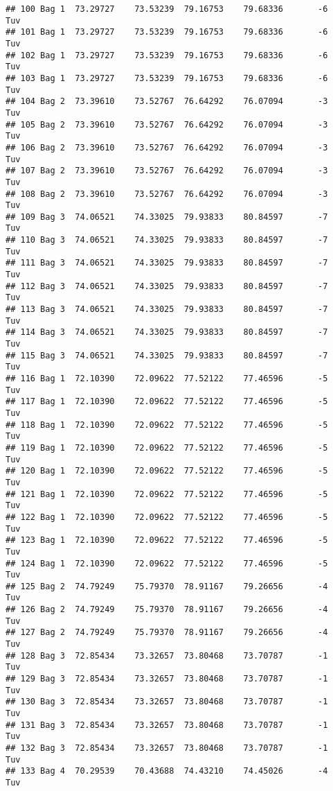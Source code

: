 \documentclass[
]{article}
\begin{document}
\begin{verbatim}
## 100 Bag 1  73.29727    73.53239  79.16753    79.68336       -6        Tuv
## 101 Bag 1  73.29727    73.53239  79.16753    79.68336       -6        Tuv
## 102 Bag 1  73.29727    73.53239  79.16753    79.68336       -6        Tuv
## 103 Bag 1  73.29727    73.53239  79.16753    79.68336       -6        Tuv
## 104 Bag 2  73.39610    73.52767  76.64292    76.07094       -3        Tuv
## 105 Bag 2  73.39610    73.52767  76.64292    76.07094       -3        Tuv
## 106 Bag 2  73.39610    73.52767  76.64292    76.07094       -3        Tuv
## 107 Bag 2  73.39610    73.52767  76.64292    76.07094       -3        Tuv
## 108 Bag 2  73.39610    73.52767  76.64292    76.07094       -3        Tuv
## 109 Bag 3  74.06521    74.33025  79.93833    80.84597       -7        Tuv
## 110 Bag 3  74.06521    74.33025  79.93833    80.84597       -7        Tuv
## 111 Bag 3  74.06521    74.33025  79.93833    80.84597       -7        Tuv
## 112 Bag 3  74.06521    74.33025  79.93833    80.84597       -7        Tuv
## 113 Bag 3  74.06521    74.33025  79.93833    80.84597       -7        Tuv
## 114 Bag 3  74.06521    74.33025  79.93833    80.84597       -7        Tuv
## 115 Bag 3  74.06521    74.33025  79.93833    80.84597       -7        Tuv
## 116 Bag 1  72.10390    72.09622  77.52122    77.46596       -5        Tuv
## 117 Bag 1  72.10390    72.09622  77.52122    77.46596       -5        Tuv
## 118 Bag 1  72.10390    72.09622  77.52122    77.46596       -5        Tuv
## 119 Bag 1  72.10390    72.09622  77.52122    77.46596       -5        Tuv
## 120 Bag 1  72.10390    72.09622  77.52122    77.46596       -5        Tuv
## 121 Bag 1  72.10390    72.09622  77.52122    77.46596       -5        Tuv
## 122 Bag 1  72.10390    72.09622  77.52122    77.46596       -5        Tuv
## 123 Bag 1  72.10390    72.09622  77.52122    77.46596       -5        Tuv
## 124 Bag 1  72.10390    72.09622  77.52122    77.46596       -5        Tuv
## 125 Bag 2  74.79249    75.79370  78.91167    79.26656       -4        Tuv
## 126 Bag 2  74.79249    75.79370  78.91167    79.26656       -4        Tuv
## 127 Bag 2  74.79249    75.79370  78.91167    79.26656       -4        Tuv
## 128 Bag 3  72.85434    73.32657  73.80468    73.70787       -1        Tuv
## 129 Bag 3  72.85434    73.32657  73.80468    73.70787       -1        Tuv
## 130 Bag 3  72.85434    73.32657  73.80468    73.70787       -1        Tuv
## 131 Bag 3  72.85434    73.32657  73.80468    73.70787       -1        Tuv
## 132 Bag 3  72.85434    73.32657  73.80468    73.70787       -1        Tuv
## 133 Bag 4  70.29539    70.43688  74.43210    74.45026       -4        Tuv

\end{verbatim}
\end{document}
